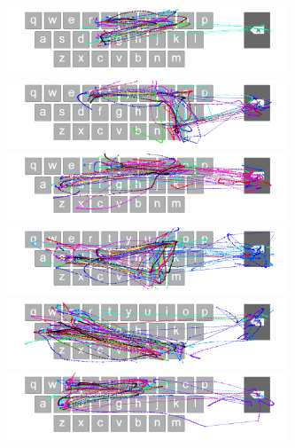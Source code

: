 \begin{figure}[t]
    \centering
	\begin{minipage}[t]{8in}
	\hspace{-20pt}
	\begin{minipage}[t]{3.1in}
		\includegraphics[width=3.3in]{Figures/fig_fit_paths}
	\end{minipage}
	\begin{minipage}[t]{3in}
		\includegraphics[width=3.3in]{Figures/fig_rim_paths}
	\end{minipage}
	\end{minipage}
	
	\begin{minipage}[t]{8in}
	\hspace{-20pt}
	\begin{minipage}[t]{3.1in}
		\includegraphics[width=3.3in]{Figures/fig_soy_paths}
	\end{minipage}
	\begin{minipage}[t]{3in}
		\includegraphics[width=3.3in]{Figures/fig_fins_paths}
	\end{minipage}
	\end{minipage}
	
	\begin{minipage}[t]{8in}
	\hspace{-20pt}
	\begin{minipage}[t]{3.1in}
		\includegraphics[width=3.3in]{Figures/fig_mane_paths}
	\end{minipage}
	\begin{minipage}[t]{3in}
		\includegraphics[width=3.3in]{Figures/fig_sure_paths}
	\end{minipage}
	\end{minipage}
	

\end{figure}

